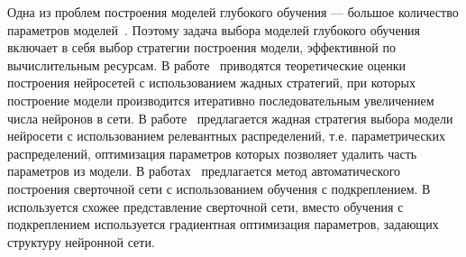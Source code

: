 \documentclass[11pt, a5paper]{dissert}
\theoremstyle{definition}
\begin{document}
Одна из проблем построения моделей глубокого обучения --- большое количество параметров моделей~\cite{hinton_rbm, hinton_init}. Поэтому задача выбора моделей глубокого обучения включает в себя выбор стратегии построения модели, эффективной по вычислительным ресурсам. В работе~\cite{greed} приводятся теоретические оценки построения нейросетей с использованием жадных стратегий,  при которых построение модели производится итеративно последовательным увеличением числа нейронов в сети. В работе~\cite{greed_mlp} предлагается жадная стратегия выбора модели нейросети с использованием релевантных распределений, т.е. параметрических распределений, оптимизация параметров которых позволяет удалить часть параметров из модели. %
В работах~\cite{reinf,reinf_predict,reinf_deep2net,reinf_transfer} предлагается метод автоматического построения сверточной сети с использованием обучения с подкреплением. В~\cite{darts} используется схожее представление сверточной сети, вместо обучения с подкреплением используется градиентная оптимизация параметров, задающих структуру нейронной сети.

\end{document}
